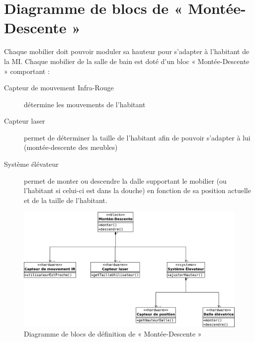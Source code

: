 \section{Diagramme de blocs de « Montée-Descente »}
Chaque mobilier doit pouvoir moduler sa hauteur pour s'adapter à l'habitant de la MI. Chaque mobilier de la salle de bain est doté d'un bloc « Montée-Descente » comportant :
\begin{description}
	\item[Capteur de mouvement Infra-Rouge] détermine les mouvements de l'habitant
	\item[Capteur laser] permet de déterminer la taille de l'habitant afin de pouvoir s'adapter à lui (montée-descente des meubles)
	\item[Système élévateur] permet de monter ou descendre la dalle supportant le mobilier (ou l'habitant si celui-ci est dans la douche) en fonction de sa position actuelle et de la taille de l'habitant.   
\end{description}
\vfill
\begin{figure}[H]
	\centering
	\includegraphics[width=1.0\linewidth]{diagrams/bathroom/diagramme_blocks_bdd2.eps}
	\caption{Diagramme de blocs de définition de « Montée-Descente »}
	\label{fig:diagramme_bdd2}
\end{figure}
\vfill
